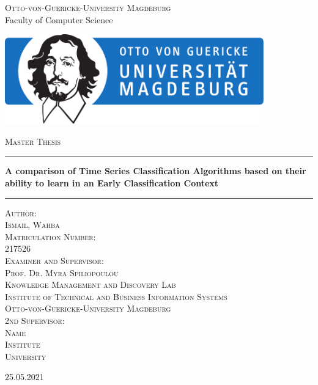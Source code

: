 
\begin{titlepage}

\begin{center}
\textsc{\normalsize {Otto-von-Guericke-University Magdeburg}} \\

Faculty of Computer Science \\
\vspace{1cm}

\includegraphics[width=11.2cm]{Figure/Signet_INF_1}
\vspace{1cm}

\textsc{\huge {Master Thesis}} \\
\vspace{0.95mm}

\rule{\linewidth}{0.3mm}
\large{\bfseries \huge A comparison of Time Series Classification Algorithms based on their ability to learn in an Early Classification Context}
\rule[0.3cm]{\linewidth}{0.3mm}

\textsc{\large {Author: \\Ismail, Wahba \\ }}
\vspace{4mm}
\textsc{\large {Matriculation Number: \\ 217526 \\ }}
\vspace{4mm}
\textsc{\large {Examiner and Supervisor: \\
Prof. Dr. Myra Spiliopoulou\\}}
\textsc{\normalsize  {Knowledge Management and Discovery Lab \\
Institute of Technical and Business Information Systems \\
Otto-von-Guericke-University Magdeburg}\\ }
\vspace{4mm}
\textsc{\large { 2nd Supervisor: \\
Name \\ }}
\textsc{\normalsize  {Institute \\
University \\ }}
\vspace{6mm}

25.05.2021 



\end{center}

\end{titlepage}